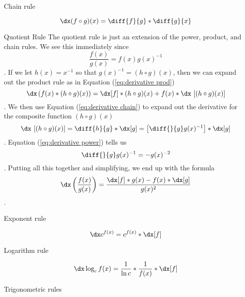 \begin{psec}{Chain rule}

    \begin{equation}\label{eq:derivative chain}
        \dx (f \circ g)(x) = \diff{f}{g} * \diff{g}{x}
    \end{equation}

\end{psec}

\begin{psec}{Quotient Rule} The quotient rule is just an extension of the
    power, product, and chain rules. We see this immediately since
    \begin{equation*}
        \frac{f(x)}{g(x)} = f(x)g(x)^{-1}
    \end{equation*}
    . If we let $h(x) = x^{-1}$ so that $g(x)^{-1} = (h\circ g)(x)$, then we can expand out the product rule as
    in Equation (\ref{eq:derivative prod})
    \begin{equation*}
        \dx \left(f(x) * (h\circ g)(x)\right) = \dx[f] *  (h\circ g)(x) + f(x) *
        \dx\ [(h\circ g)(x)]
    \end{equation*}. We then use Equation (\ref{eq:derivative chain}) to expand out the
    derivative for the composite function $(h \circ g)(x)$
    \begin{equation*}
        \dx\ [(h\circ g)(x)] = \diff{h}{g} * \dx[g] = \left[\diff{}{g} g(x)^{-1}
        \right] * \dx[g]
    \end{equation*}. Equation (\ref{eq:derivative power}) tells us
    \begin{equation*}
        \diff{}{g} g(x)^{-1} = -g(x)^{-2}
    \end{equation*}. Putting all this together and simplifying, we end up with
    the formula
    \begin{equation}
        \dx \left(\frac{f(x)}{g(x)}\right) = \frac{\dx[f] * g(x) - f(x) * \dx[g]
        }{g(x)^2}
    \end{equation}.

\end{psec}

\begin{psec}{Exponent rule}

    \begin{equation}
        \dx c ^ {f(x)} = c ^ {f(x)} * \dx[f]
    \end{equation}

\end{psec}

\begin{psec}{Logarithm rule}

    \begin{equation}
        \dx \log_c f(x) = \frac{1}{\ln c} * \frac{1}{f(x)} * \dx[f]
    \end{equation}

\end{psec}


\begin{psec}{Trigonometric rules}


\end{psec}
